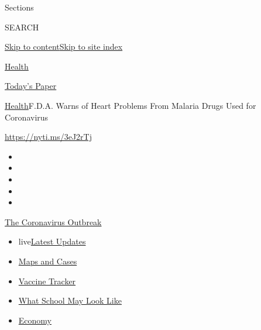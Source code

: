 Sections

SEARCH

\protect\hyperlink{site-content}{Skip to
content}\protect\hyperlink{site-index}{Skip to site index}

\href{https://www.nytimes.com/section/health}{Health}

\href{https://myaccount.nytimes.com/auth/login?response_type=cookie\&client_id=vi}{}

\href{https://www.nytimes.com/section/todayspaper}{Today's Paper}

\href{/section/health}{Health}\textbar{}F.D.A. Warns of Heart Problems
From Malaria Drugs Used for Coronavirus

\url{https://nyti.ms/3eJ2rTj}

\begin{itemize}
\item
\item
\item
\item
\item
\end{itemize}

\href{https://www.nytimes.com/news-event/coronavirus?action=click\&pgtype=Article\&state=default\&region=TOP_BANNER\&context=storylines_menu}{The
Coronavirus Outbreak}

\begin{itemize}
\tightlist
\item
  live\href{https://www.nytimes.com/2020/08/01/world/coronavirus-covid-19.html?action=click\&pgtype=Article\&state=default\&region=TOP_BANNER\&context=storylines_menu}{Latest
  Updates}
\item
  \href{https://www.nytimes.com/interactive/2020/us/coronavirus-us-cases.html?action=click\&pgtype=Article\&state=default\&region=TOP_BANNER\&context=storylines_menu}{Maps
  and Cases}
\item
  \href{https://www.nytimes.com/interactive/2020/science/coronavirus-vaccine-tracker.html?action=click\&pgtype=Article\&state=default\&region=TOP_BANNER\&context=storylines_menu}{Vaccine
  Tracker}
\item
  \href{https://www.nytimes.com/interactive/2020/07/29/us/schools-reopening-coronavirus.html?action=click\&pgtype=Article\&state=default\&region=TOP_BANNER\&context=storylines_menu}{What
  School May Look Like}
\item
  \href{https://www.nytimes.com/live/2020/07/31/business/stock-market-today-coronavirus?action=click\&pgtype=Article\&state=default\&region=TOP_BANNER\&context=storylines_menu}{Economy}
\end{itemize}

